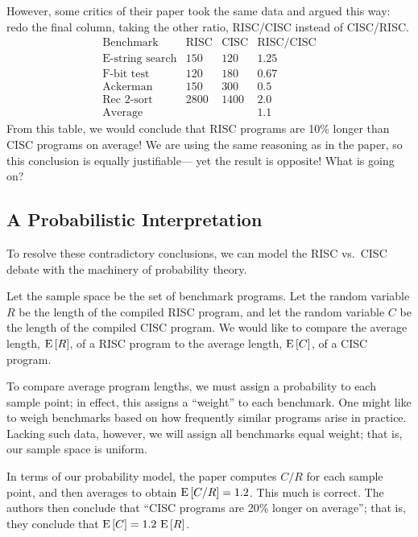 \documentclass[11pt,twoside]{article}
\begin{document}
However, some critics of their paper took the same data and argued this
way: redo the final column, taking the other ratio, RISC/CISC instead of
CISC/RISC.
\[
\begin{array}{lccc}
\text{Benchmark}        & \text{RISC}   & \text{CISC}   & \text{RISC/CISC}\\
\hline
\text{E-string search}  & 150           & 120           & 1.25 \\
\text{F-bit test}       & 120           & 180           & 0.67 \\
\text{Ackerman}         & 150           & 300           & 0.5 \\
\text{Rec 2-sort}       & 2800          & 1400          & 2.0 \\
\hline
\text{Average}          &               &               & 1.1
\end{array}
\]
From this table, we would conclude that RISC programs are 10\% longer
than CISC programs on average!  We are using the same reasoning as in
the paper, so this conclusion is equally justifiable--- yet the result
is opposite!  What is going on?

\subsection{A Probabilistic Interpretation}

To resolve these contradictory conclusions, we can model the RISC vs.\ CISC
debate with the machinery of probability theory.

Let the sample space be the set of benchmark programs.  Let the random
variable $R$ be the length of the compiled RISC program, and let the
random variable $C$ be the length of the compiled CISC program.  We would
like to compare the average length, $\mathop{\textup{E}}\nolimits\left[R\right]$, of a RISC program to the
average length, $\mathop{\textup{E}}\nolimits\left[C\right]$, of a CISC program.

To compare average program lengths, we must assign a probability to
each sample point; in effect, this assigns a ``weight'' to each
benchmark.  One might like to weigh benchmarks based on how frequently
similar programs arise in practice.  Lacking such data, however, we
will assign all benchmarks equal weight; that is, our sample space is
uniform.

In terms of our probability model, the paper computes $C / R$ for each
sample point, and then averages to obtain $\mathop{\textup{E}}\nolimits\left[C / R\right] = 1.2$.  This
much is correct.  The authors then conclude that ``CISC programs are 20\%
longer on average''; that is, they conclude that $\mathop{\textup{E}}\nolimits\left[C\right] = 1.2\,
\mathop{\textup{E}}\nolimits\left[R\right]$.
\end{document}
